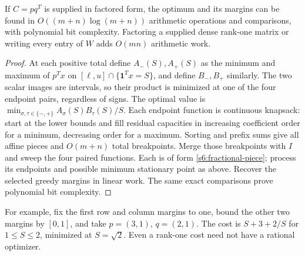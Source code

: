 \begin{proposition}\label{s6:rank-one-cost}
If $C=pq^T$ is supplied in factored form, the optimum and its margins
can be found in $O((m+n)\log(m+n))$ arithmetic operations and comparisons,
with polynomial bit complexity. Factoring a supplied dense rank-one
matrix or writing every entry of $W$ adds $O(mn)$ arithmetic work.
\end{proposition}
\begin{proof}
At each positive total define $A_-(S),A_+(S)$ as the minimum and maximum
of $p^Tx$ on $[\ell,u]\cap\{\mathbf1^Tx=S\}$, and define $B_-,B_+$
similarly. The two scalar images are intervals, so their product is
minimized at one of the four endpoint pairs, regardless of signs.
The optimal value is
$\min_{\sigma,\tau\in\{-,+\}}A_\sigma(S)B_\tau(S)/S$.
Each endpoint function is continuous knapsack: start at the lower bounds
and fill residual capacities in increasing coefficient order for a
minimum, decreasing order for a maximum. Sorting and prefix sums give
all affine pieces and $O(m+n)$ total breakpoints. Merge those breakpoints
with $I$ and sweep the four paired functions. Each is of form
\eqref{s6:fractional-piece}; process its endpoints and possible minimum
stationary point as above. Recover the selected greedy margins in linear
work. The same exact comparisons prove polynomial bit complexity.
\end{proof}
For example, fix the first row and column margins to one, bound the
other two margins by $[0,1]$, and take $p=(3,1)$, $q=(2,1)$.
The cost is $S+3+2/S$ for $1\le S\le2$, minimized at $S=\sqrt2$.
Even a rank-one cost need not have a rational optimizer.

